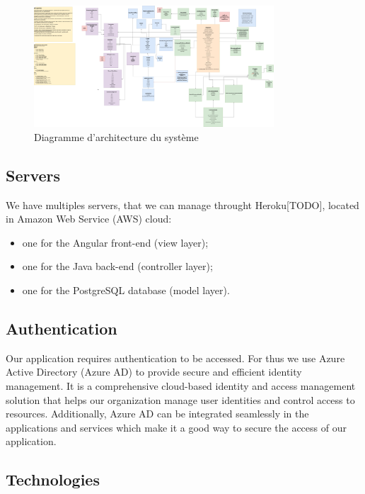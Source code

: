 \begin{figure}[h!]
	\centering
	\includegraphics[width=0.8\textwidth]{Image/architecture.jpg}
	\caption{Diagramme d'architecture du système}
	\label{fig:architecture_diagram}
\end{figure}

\newpage

\subsection{Servers}

We have multiples servers, that we can manage throught Heroku[TODO], located in Amazon Web Service (AWS) cloud:

\begin{itemize}
	\item one for the Angular front-end (view layer);
	\item one for the Java back-end (controller layer);
	\item one for the PostgreSQL database (model layer).
\end{itemize}

\subsection{Authentication}

Our application requires authentication to be accessed. For thus we use Azure Active Directory (Azure AD) to provide secure and efficient identity management. It is a comprehensive cloud-based identity and access management solution that helps our organization manage user identities and control access to resources.
Additionally, Azure AD can be integrated seamlessly in the applications and services which make it a good way to secure the access of our application.


\subsection{Technologies}

